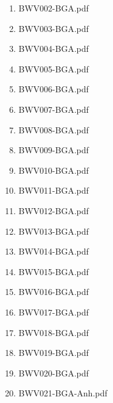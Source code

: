 \documentclass[11pt]{article}
\begin{document}
\begin{enumerate}
\begin{enumerate}
\begin{enumerate}
\item BWV002-BGA.pdf
\label{sec-1-1-1-1-44-6-7-1-2}

\item BWV003-BGA.pdf
\label{sec-1-1-1-1-44-6-7-1-3}

\item BWV004-BGA.pdf
\label{sec-1-1-1-1-44-6-7-1-4}

\item BWV005-BGA.pdf
\label{sec-1-1-1-1-44-6-7-1-5}

\item BWV006-BGA.pdf
\label{sec-1-1-1-1-44-6-7-1-6}

\item BWV007-BGA.pdf
\label{sec-1-1-1-1-44-6-7-1-7}

\item BWV008-BGA.pdf
\label{sec-1-1-1-1-44-6-7-1-8}

\item BWV009-BGA.pdf
\label{sec-1-1-1-1-44-6-7-1-9}

\item BWV010-BGA.pdf
\label{sec-1-1-1-1-44-6-7-1-10}

\item BWV011-BGA.pdf
\label{sec-1-1-1-1-44-6-7-1-11}

\item BWV012-BGA.pdf
\label{sec-1-1-1-1-44-6-7-1-12}

\item BWV013-BGA.pdf
\label{sec-1-1-1-1-44-6-7-1-13}

\item BWV014-BGA.pdf
\label{sec-1-1-1-1-44-6-7-1-14}

\item BWV015-BGA.pdf
\label{sec-1-1-1-1-44-6-7-1-15}

\item BWV016-BGA.pdf
\label{sec-1-1-1-1-44-6-7-1-16}

\item BWV017-BGA.pdf
\label{sec-1-1-1-1-44-6-7-1-17}

\item BWV018-BGA.pdf
\label{sec-1-1-1-1-44-6-7-1-18}

\item BWV019-BGA.pdf
\label{sec-1-1-1-1-44-6-7-1-19}

\item BWV020-BGA.pdf
\label{sec-1-1-1-1-44-6-7-1-20}

\item BWV021-BGA-Anh.pdf
\label{sec-1-1-1-1-44-6-7-1-21}


\end{enumerate}
\end{enumerate}
\end{enumerate}
\end{document}
